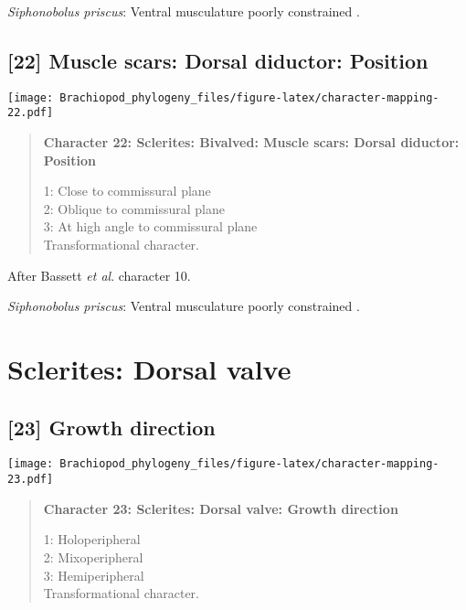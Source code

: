 \documentclass[openany]{book}
\theoremstyle{definition}
\theoremstyle{definition}
\theoremstyle{definition}
\theoremstyle{remark}
\begin{document}
\hypertarget{Siphonobolus_priscus-coding-21}{}
\emph{Siphonobolus priscus}: Ventral musculature poorly constrained
\citep{Williams2000LinguliformeaCraniiformea, Popov2009Earlyontogeny}.

\subsection*{{[}22{]} Muscle scars: Dorsal diductor:
Position}\label{muscle-scars-dorsal-diductor-position}

\texttt{[image: Brachiopod\_phylogeny\_files/figure-latex/character-mapping-22.pdf]}

\begin{quote}
\textbf{Character 22: Sclerites: Bivalved: Muscle scars: Dorsal
diductor: Position}

1: Close to commissural plane\\
2: Oblique to commissural plane\\
3: At high angle to commissural plane\\
Transformational character.
\end{quote}

After Bassett \emph{et al}.
\citeyearpar{Bassett2001Functionalmorphology} character 10.

\hypertarget{Siphonobolus_priscus-coding-22}{}
\emph{Siphonobolus priscus}: Ventral musculature poorly constrained
\citep{Williams2000LinguliformeaCraniiformea, Popov2009Earlyontogeny}.

\section{Sclerites: Dorsal valve}\label{sclerites-dorsal-valve}

\subsection*{{[}23{]} Growth direction}\label{growth-direction}

\texttt{[image: Brachiopod\_phylogeny\_files/figure-latex/character-mapping-23.pdf]}

\begin{quote}
\textbf{Character 23: Sclerites: Dorsal valve: Growth direction}

1: Holoperipheral\\
2: Mixoperipheral\\
3: Hemiperipheral\\
Transformational character.
\end{quote}
\end{document}
